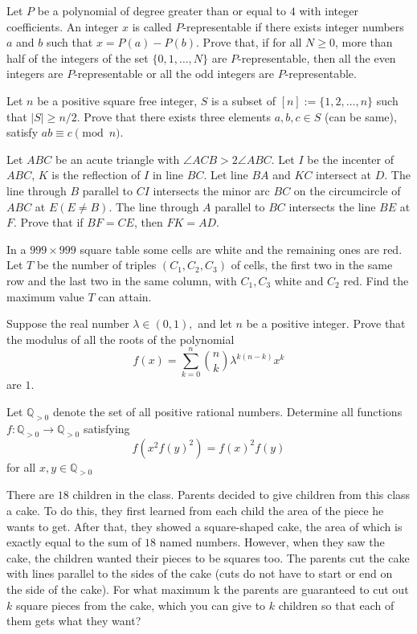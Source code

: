 \documentclass[11pt]{scrartcl}
\begin{document}
\begin{problem}[140536805208587401]
Let $P$ be a polynomial of degree greater than or equal to $4$ with integer coefficients. An integer $x$ is called $P$-representable if there exists integer numbers $a$ and $b$ such that $x = P(a) - P(b)$. Prove that, if for all $N \geq 0$, more than half of the integers of the set $\{0,1,\dots,N\}$ are $P$-representable, then all the even integers are $P$-representable or all the odd integers are $P$-representable.
\end{problem}
\begin{problem}[146560315064259124]
Let $n$ be a positive square free integer, $S$ is a subset of $[n]:=\{1,2,\ldots ,n\}$ such that $|S|\ge n/2.$ Prove that there exists three elements $a,b,c\in S$ (can be same), satisfy $ab\equiv c\pmod n.$
\end{problem}
\begin{problem}[156060759856343521]
Let $ABC$ be an acute triangle with $\angle ACB>2 \angle ABC$. Let $I$ be the incenter of $ABC$, $K$ is the reflection of $I$ in line $BC$. Let line $BA$ and $KC$ intersect at $D$. The line through $B$ parallel to $CI$ intersects the minor arc $BC$ on the circumcircle of $ABC$ at $E(E \neq B)$. The line through $A$ parallel to $BC$ intersects the line $BE$ at $F$.
Prove that if $BF=CE$, then $FK=AD$.
\end{problem}
\begin{problem}[168901060554419884]
In a $999 \times 999$ square table some cells are white and the remaining ones are red. Let $T$ be the number of triples $(C_1,C_2,C_3)$ of cells, the first two in the same row and the last two in the same column, with $C_1,C_3$ white and $C_2$ red. Find the maximum value $T$ can attain.
\end{problem}
\begin{problem}[173308636944231809]
Suppose the real number $\lambda \in \left( 0,1\right),$ and let $n$ be a positive integer. Prove that the modulus of all the roots of the polynomial$$f\left ( x \right )=\sum_{k=0}^{n}\binom{n}{k}\lambda^{k\left ( n-k \right )}x^{k}$$are $1.$
\end{problem}
\begin{problem}[179717448968317497]
	Let $\mathbb{Q}_{>0}$ denote the set of all positive rational numbers. Determine all functions $f:\mathbb{Q}_{>0}\to \mathbb{Q}_{>0}$ satisfying$$f(x^2f(y)^2)=f(x)^2f(y)$$for all $x,y\in\mathbb{Q}_{>0}$
\end{problem}
\begin{problem}[208479683430579745]
	There are $18$ children in the class. Parents decided to give children from this class a cake. To do this, they first learned from each child the area of the piece he wants to get. After that, they showed a square-shaped cake, the area of which is exactly equal to the sum of $18$ named numbers. However, when they saw the cake, the children wanted their pieces to be squares too. The parents cut the cake with lines parallel to the sides of the cake (cuts do not have to start or end on the side of the cake). For what maximum k the parents are guaranteed to cut out $k$ square pieces from the cake, which you can give to $k$ children so that each of them gets what they want?
\end{problem}
\end{document}
